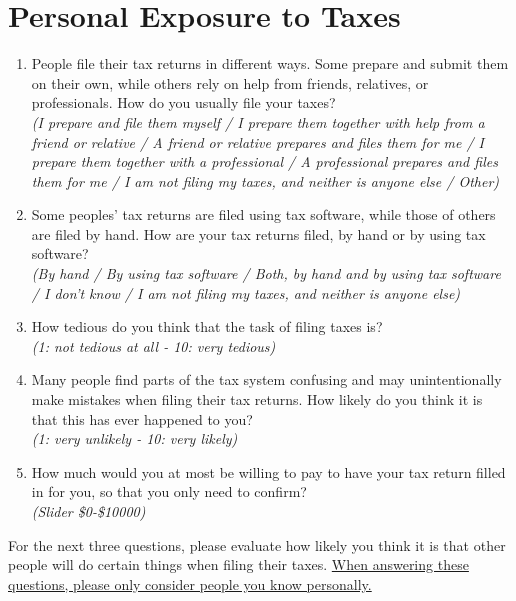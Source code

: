 \documentclass[11pt]{article}
\begin{document}
\section*{Personal Exposure to Taxes}
\begin{enumerate}[resume]
    \item People file their tax returns in different ways. Some prepare and submit them on their own, while others rely on help from friends, relatives, or professionals. How do you usually file your taxes?\\ 
    \textit{(I prepare and file them myself / I prepare them together with help from a friend or relative /  A friend or relative prepares and files them for me / I prepare them together with a professional / A professional prepares and files them for me / I am not filing my taxes, and neither is anyone else / Other)}
    \item Some peoples' tax returns are filed using tax software, while those of others are filed by hand. How are your tax returns filed, by hand or by using tax software? \\ 
    \textit{(By hand / By using tax software / Both, by hand and by using tax software / I don't know / I am not filing my taxes, and neither is anyone else)}
    \item How tedious do you think that the task of filing taxes is? \\ \textit{(1: not tedious at all - 10: very tedious)}
    \item Many people find parts of the tax system confusing and may unintentionally make mistakes when filing their tax returns. How likely do you think it is that this has ever happened to you?\\
    \textit{(1: very unlikely - 10: very likely) }
    \item How much would you at most be willing to pay to have your tax return filled in for you, so that you only need to confirm? \\
    \textit{(Slider \$0-\$10000)}
\end{enumerate}
For the next three questions, please evaluate how likely you think it is that other people will do certain things when filing their taxes. \uline{When answering these questions, please only consider people you know personally.}
\end{document}
